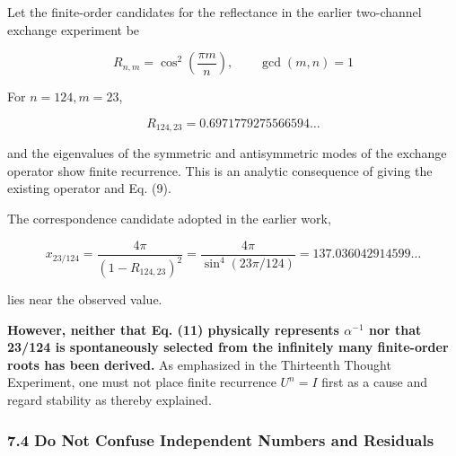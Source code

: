 \documentclass[
  a4paper,
]{article}
\begin{document}
Let the finite-order candidates for the reflectance in the earlier
two-channel exchange experiment be

\[
R_{n,m}=\cos^2\left(\frac{\pi m}{n}\right),
\qquad \gcd(m,n)=1
\tag{9}
\]

For \(n=124,m=23\),

\[
R_{124,23}=0.6971779275566594\ldots
\tag{10}
\]

and the eigenvalues of the symmetric and antisymmetric modes of the
exchange operator show finite recurrence. This is an analytic
consequence of giving the existing operator and Eq. (9).

The correspondence candidate adopted in the earlier work,

\[
x_{23/124}=\frac{4\pi}{(1-R_{124,23})^2}
=\frac{4\pi}{\sin^4(23\pi/124)}
=137.036042914599\ldots
\tag{11}
\]

lies near the observed value.

\textbf{However, neither that Eq. (11) physically represents
\(\alpha^{-1}\) nor that 23/124 is spontaneously selected from the
infinitely many finite-order roots has been derived.} As emphasized in
the Thirteenth Thought Experiment, one must not place finite recurrence
\(U^n=I\) first as a cause and regard stability as thereby explained.

\subsubsection{7.4 Do Not Confuse Independent Numbers and
Residuals}\label{do-not-confuse-independent-numbers-and-residuals}
\end{document}
